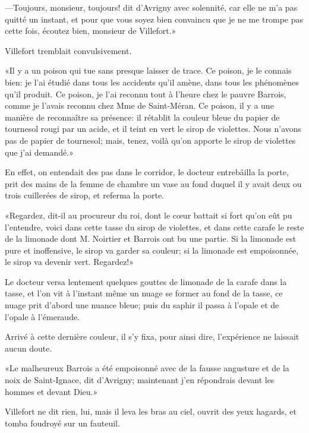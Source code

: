 —Toujours, monsieur, toujours! dit d'Avrigny avec solennité, car elle ne m'a pas quitté un instant, et pour que vous soyez bien convaincu que je ne me trompe pas cette fois, écoutez bien, monsieur de Villefort.» 

Villefort tremblait convulsivement. 

«Il y a un poison qui tue sans presque laisser de trace. Ce poison, je le connais bien: je l'ai étudié dans tous les accidents qu'il amène, dans tous les phénomènes qu'il produit. Ce poison, je l'ai reconnu tout à l'heure chez le pauvre Barrois, comme je l'avais reconnu chez Mme de Saint-Méran. Ce poison, il y a une manière de reconnaître sa présence: il rétablit la couleur bleue du papier de tournesol rougi par un acide, et il teint en vert le sirop de violettes. Nous n'avons pas de papier de tournesol; mais, tenez, voilà qu'on apporte le sirop de violettes que j'ai demandé.» 

En effet, on entendait des pas dans le corridor, le docteur entrebâilla la porte, prit des mains de la femme de chambre un vase au fond duquel il y avait deux ou trois cuillerées de sirop, et referma la porte. 

«Regardez, dit-il au procureur du roi, dont le cœur battait si fort qu'on eût pu l'entendre, voici dans cette tasse du sirop de violettes, et dans cette carafe le reste de la limonade dont M. Noirtier et Barrois ont bu une partie. Si la limonade est pure et inoffensive, le sirop va garder sa couleur; si la limonade est empoisonnée, le sirop va devenir vert. Regardez!» 

Le docteur versa lentement quelques gouttes de limonade de la carafe dans la tasse, et l'on vit à l'instant même un nuage se former au fond de la tasse, ce nuage prit d'abord une nuance bleue; puis du saphir il passa à l'opale et de l'opale à l'émeraude. 

Arrivé à cette dernière couleur, il s'y fixa, pour ainsi dire, l'expérience ne laissait aucun doute. 

«Le malheureux Barrois a été empoisonné avec de la fausse angusture et de la noix de Saint-Ignace, dit d'Avrigny; maintenant j'en répondrais devant les hommes et devant Dieu.» 

Villefort ne dit rien, lui, mais il leva les bras au ciel, ouvrit des yeux hagards, et tomba foudroyé sur un fauteuil. 